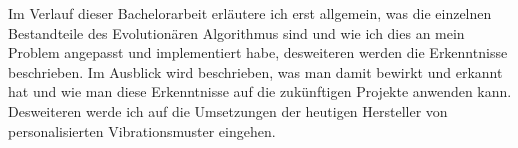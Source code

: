 
Im Verlauf dieser Bachelorarbeit erl{\"a}utere ich erst allgemein, was die einzelnen Bestandteile des Evolution{\"a}ren Algorithmus sind und wie ich dies an mein Problem angepasst und implementiert habe, desweiteren werden die Erkenntnisse beschrieben. 
Im Ausblick wird beschrieben, was man damit bewirkt und erkannt hat und wie man diese Erkenntnisse auf die zuk{\"u}nftigen Projekte anwenden kann. 
Desweiteren werde ich auf die Umsetzungen der heutigen Hersteller von personalisierten Vibrationsmuster eingehen.

